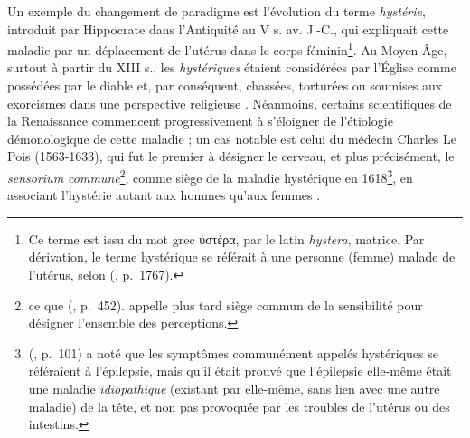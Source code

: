 \label{hysterie} Un exemple du changement de paradigme est l'évolution du terme \textit{hystérie}, introduit par Hippocrate dans l'Antiquité au V\ieme{} s. av. J.-C., qui expliquait cette maladie par un déplacement de l'utérus dans le corps féminin\footnote{Ce terme est issu du mot grec \foreignlanguage{greek}{ὑστέρα}, par le latin \textit{hystera}, \og{}matrice\fg{}. Par dérivation, le terme \og{}hystérique\fg{} se référait à une personne \og{}(femme) malade de l'utérus\fg{}, selon \citeauthor{rey2011dictionnaire} (\citeyear{rey2011dictionnaire}, p.~1767).}. Au Moyen Âge, surtout à partir du XIII\ieme{} s., les \textit{hystériques} étaient considérées par l'Église comme possédées par le diable et, par conséquent, chassées, torturées ou soumises aux exorcismes dans une perspective religieuse \citep[p.~113]{tasca2012women}. Néanmoins, certains scientifiques de la Renaissance commencent progressivement à s'éloigner de l'étiologie démonologique de cette maladie ; un cas notable est celui du médecin Charles Le Pois (1563-1633), qui fut le premier à désigner le cerveau, et plus précisément, le \textit{sensorium commune}\footnote{ce que \citeauthor{kant1863} (\citeyear{kant1863}, p.~452). appelle plus tard \og{}siège commun de la sensibilité\fg{} pour désigner l'ensemble des perceptions.}, comme siège de la maladie hystérique en 1618\footnote{\citeauthor{lepois1618} (\citeyear{lepois1618}, p.~101) a noté que les symptômes communément appelés hystériques se référaient à l'épilepsie, mais qu'il était prouvé que l'épilepsie elle-même était une maladie \textit{idiopathique} (existant par elle-même, sans lien avec une autre maladie) de la tête, et non pas provoquée par les troubles de l'utérus ou des intestins.}, en associant l'hystérie autant aux hommes qu'aux femmes \citep[p.~235]{wright1980}.  

